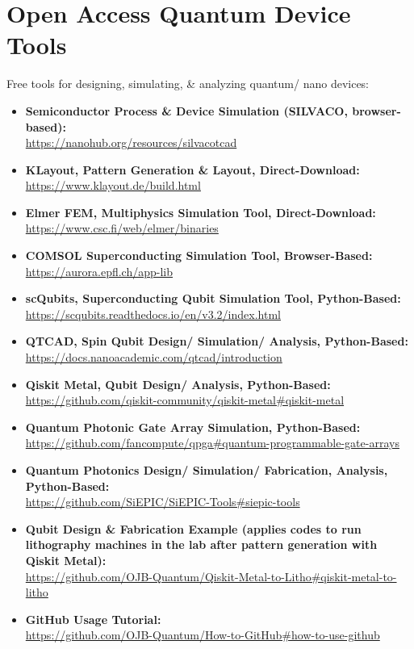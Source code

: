 \chapter{\LARGE{Open Access Quantum Device Tools}}

\begin{flushleft}
\large Free tools for designing, simulating, \& analyzing quantum/ nano devices:
\end{flushleft}

\normalsize\begin{itemize}

  \item\textbf{Semiconductor Process \& Device Simulation (SILVACO, browser-based):}\\
\url{https://nanohub.org/resources/silvacotcad}
  \item\textbf{KLayout, Pattern Generation \& Layout, Direct-Download:}\\
\url{https://www.klayout.de/build.html}
  \item\textbf{Elmer FEM, Multiphysics Simulation Tool, Direct-Download:}\\
\url{https://www.csc.fi/web/elmer/binaries}
  \item\textbf{COMSOL Superconducting Simulation Tool, Browser-Based:}\\
\url{https://aurora.epfl.ch/app-lib}
  \item\textbf{scQubits, Superconducting Qubit Simulation Tool, Python-Based:}\\
\url{https://scqubits.readthedocs.io/en/v3.2/index.html}
  \item\textbf{QTCAD, Spin Qubit Design/ Simulation/ Analysis, Python-Based:}\\
\url{https://docs.nanoacademic.com/qtcad/introduction}
  \item\textbf{Qiskit Metal, Qubit Design/ Analysis, Python-Based:}\\
\url{https://github.com/qiskit-community/qiskit-metal#qiskit-metal}
  \item\textbf{Quantum Photonic Gate Array Simulation, Python-Based:}\\
\url{https://github.com/fancompute/qpga#quantum-programmable-gate-arrays}
  \item\textbf{Quantum Photonics Design/ Simulation/ Fabrication, Analysis, Python-Based:}\\
\url{https://github.com/SiEPIC/SiEPIC-Tools#siepic-tools}
  \item\textbf{Qubit Design \& Fabrication Example (applies codes to run lithography machines in the lab after pattern generation with Qiskit Metal):}\\
\url{https://github.com/OJB-Quantum/Qiskit-Metal-to-Litho#qiskit-metal-to-litho}
  \item\textbf{GitHub Usage Tutorial:}\\
\url{https://github.com/OJB-Quantum/How-to-GitHub#how-to-use-github}\\

\end{itemize}
